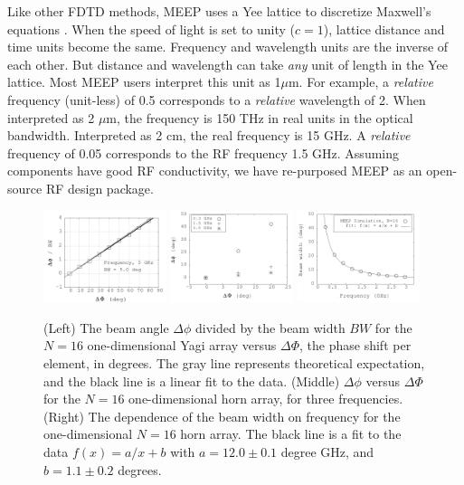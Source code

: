 \documentclass[11pt]{amsart}
\begin{document}
Like other FDTD methods, MEEP uses a Yee lattice to discretize Maxwell's equations \cite{10.1109/tap.1966.1138693}.  When the speed of light is set to unity ($c = 1$), lattice distance and time units become the same.  Frequency and wavelength units are the inverse of each other.  But distance and wavelength can take \textit{any} unit of length in the Yee lattice.  Most MEEP users interpret this unit as 1$\mu$m.  For example, a \textit{relative} frequency (unit-less) of 0.5 corresponds to a \textit{relative} wavelength of 2.  When interpreted as 2 $\mu$m, the frequency is 150 THz in real units in the optical bandwidth.  Interpreted as 2 cm, the real frequency is 15 GHz.  A \textit{relative} frequency of 0.05 corresponds to the RF frequency 1.5 GHz.  Assuming components have good RF conductivity, we have re-purposed MEEP as an open-source RF design package.  

\begin{figure}[ht]
\centering
\includegraphics[width=0.32\textwidth]{figures/Oct30_plot1.png}
\includegraphics[width=0.32\textwidth]{figures/Aug11_plot2.png}
\includegraphics[width=0.32\textwidth]{figures/Aug11_plot1.png}
\caption{\label{fig:pa_1} (Left) The beam angle $\Delta \phi$ divided by the beam width $BW$ for the $N = 16$ one-dimensional Yagi array versus $\Delta \Phi$, the phase shift per element, in degrees. The gray line represents theoretical expectation, and the black line is a linear fit to the data.  (Middle) $\Delta \phi$ versus $\Delta \Phi$ for the $N=16$ one-dimensional horn array, for three frequencies.  (Right) The dependence of the beam width on frequency for the one-dimensional $N=16$ horn array.  The black line is a fit to the data $f(x) = a/x + b$ with $a=12.0\pm 0.1$ degree GHz, and $b=1.1\pm 0.2$ degrees.}
\end{figure}
\end{document}
